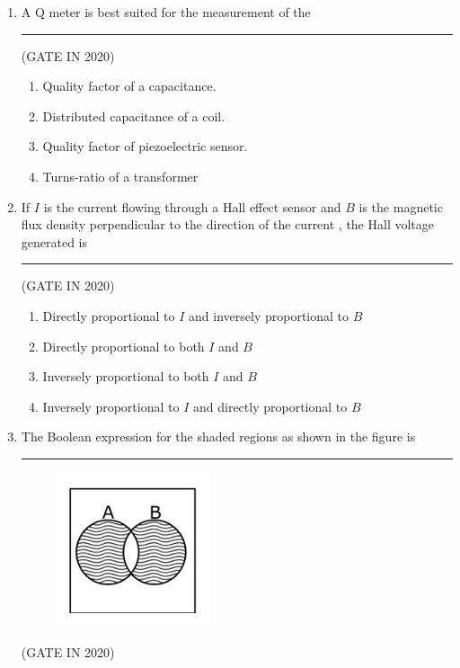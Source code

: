 \documentclass[journal,12pt,onecolumn]{IEEEtran}
\theoremstyle{remark}
\begin{document}
\begin{enumerate}
\item A Q meter is best suited for the measurement of the \rule{2cm}{0.4pt}

\hfill{(GATE IN 2020)}
\begin{enumerate}
\item Quality factor of a capacitance.
\item Distributed capacitance of a coil.
\item Quality factor of piezoelectric sensor.
\item Turns-ratio of a transformer
\end{enumerate}

\item If $I$ is the current flowing through a Hall effect sensor and $B$ is the magnetic flux density perpendicular to the direction of the current , the Hall voltage generated is \rule{2cm}{0.4pt}

\hfill{(GATE IN 2020)}
\begin{enumerate}
\item Directly proportional to $I$ and inversely proportional to $B$
\item Directly proportional to both $I$ and $B$
\item Inversely proportional to both $I$ and $B$
\item Inversely proportional to $I$ and directly proportional to $B$
\end{enumerate}

\item The Boolean expression for the shaded regions as shown in the figure is \rule{2cm}{0.4pt}
\begin{figure}[H]
\centering
\includegraphics[width=0.3\columnwidth]{figs/q8.jpg}
\caption*{}
\label{fig:q8}
\end{figure}

\hfill{(GATE IN 2020)}
\begin{enumerate}
\end{enumerate}


\end{enumerate}
\end{document}

